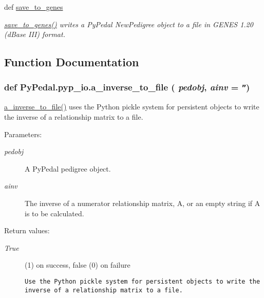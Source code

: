 \begin{CompactItemize}
def \hyperlink{namespacePyPedal_1_1pyp__io_9ac6e6f02042c2309f1ecb2d24e98249}{save\_\-to\_\-genes}
\begin{CompactList}\small\item\em \hyperlink{namespacePyPedal_1_1pyp__io_9ac6e6f02042c2309f1ecb2d24e98249}{save\_\-to\_\-genes()} writes a Py\-Pedal New\-Pedigree object to a file in GENES 1.20 (d\-Base III) format. \item\end{CompactList}\end{CompactItemize}


\subsection{Function Documentation}
\hypertarget{namespacePyPedal_1_1pyp__io_589906b4f0fdebb5b6c29e836c92b33c}{
\subsubsection[a\_\-inverse\_\-to\_\-file]{\setlength{\rightskip}{0pt plus 5cm}def Py\-Pedal.pyp\_\-io.a\_\-inverse\_\-to\_\-file ( {\em pedobj},  {\em ainv} = {\tt ''})}}
\label{namespacePyPedal_1_1pyp__io_589906b4f0fdebb5b6c29e836c92b33c}


\hyperlink{namespacePyPedal_1_1pyp__io_589906b4f0fdebb5b6c29e836c92b33c}{a\_\-inverse\_\-to\_\-file()} uses the Python pickle system for persistent objects to write the inverse of a relationship matrix to a file. 

\begin{Desc}
\item[Parameters:]
\begin{description}
\item[{\em pedobj}]A Py\-Pedal pedigree object. \item[{\em ainv}]The inverse of a numerator relationship matrix, A, or an empty string if A is to be calculated. \end{description}
\end{Desc}
\begin{Desc}
\item[Return values:]
\begin{description}
\item[{\em True}](1) on success, false (0) on failure

\footnotesize\begin{verbatim}Use the Python pickle system for persistent objects to write the inverse of a relationship matrix to a file.
\end{verbatim}
\normalsize
 \end{description}
\end{Desc}


